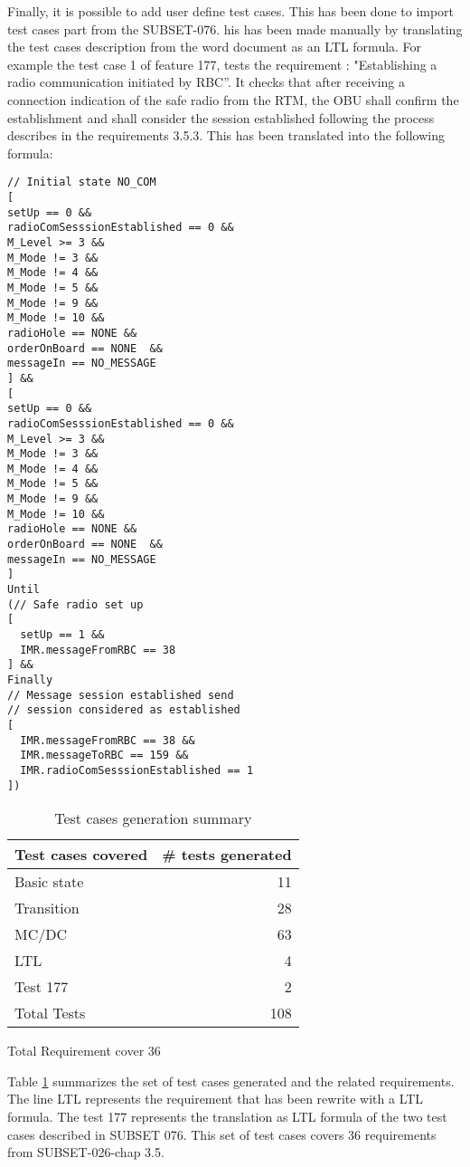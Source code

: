 Finally, it is possible to add user define test cases. This has been
done to import test cases part from the SUBSET-076. his has been made
manually by translating the test cases description from the word
document as an LTL formula. 
For example the test case 1 of feature  177, tests the requirement :
"Establishing a radio communication initiated by RBC''.  It checks
that after receiving a connection indication of the safe radio
from the RTM, the OBU  shall confirm the establishment and shall
consider the session established following the process describes in
the requirements 3.5.3. This has been translated into the following
formula:
\begin{multicols}{2}
\begin{verbatim}
// Initial state NO_COM
[
setUp == 0 &&
radioComSesssionEstablished == 0 && 
M_Level >= 3 && 
M_Mode != 3 &&
M_Mode != 4 &&
M_Mode != 5 &&
M_Mode != 9 &&
M_Mode != 10 &&
radioHole == NONE &&
orderOnBoard == NONE  &&
messageIn == NO_MESSAGE
] && 
[
setUp == 0 &&
radioComSesssionEstablished == 0 && 
M_Level >= 3 && 
M_Mode != 3 &&
M_Mode != 4 &&
M_Mode != 5 &&
M_Mode != 9 &&
M_Mode != 10 &&
radioHole == NONE &&
orderOnBoard == NONE  &&
messageIn == NO_MESSAGE 
]  
Until
(// Safe radio set up
[
  setUp == 1 &&
  IMR.messageFromRBC == 38 
] &&
Finally 
// Message session established send 
// session considered as established
[
  IMR.messageFromRBC == 38 &&
  IMR.messageToRBC == 159 &&
  IMR.radioComSesssionEstablished == 1
])
\end{verbatim}
\end{multicols}
\begin{table}[htbp]
\centering
\begin{tabular}{lr}\toprule
  Test cases covered & \# tests generated  \\\midrule
  Basic state & 11 \\
  Transition & 28 \\
  MC/DC & 63 \\
  LTL & 4 \\
  Test 177 & 2 \\ \midrule
  Total Tests& 108\\\bottomrule
\end{tabular}

\raggedleft Total Requirement cover 36
\caption{\label{tbl:test_summary} Test cases generation summary}
\end{table}

Table \ref{tbl:test_summary} summarizes the set of test cases
generated and the related requirements. The line LTL represents the
requirement that has been rewrite with a LTL formula. The test 177
represents the translation as LTL formula of the two test cases described
in SUBSET 076. This set of test cases covers 36 requirements from SUBSET-026-chap 3.5.


